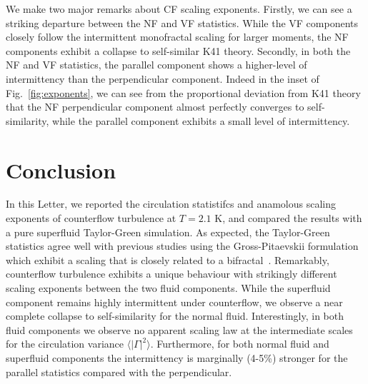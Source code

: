 \documentclass[%
 reprint,
 amsmath,amssymb,
 aps,
 prl,
]{revtex4-2}
\begin{document}
We make two major remarks about CF scaling exponents. 
Firstly, we can see a striking departure between the NF and VF statistics.
While the VF components closely follow the intermittent monofractal scaling for larger moments, the NF components exhibit a collapse to self-similar K41 theory.
Secondly, in both the NF and VF statistics, the parallel component shows a higher-level of intermittency than the perpendicular component. 
Indeed in the inset of Fig.~\ref{fig:exponents}, we can see from the proportional deviation from K41 theory that the NF perpendicular component almost perfectly converges to self-similarity, while the parallel component exhibits a small level of intermittency.

\section{Conclusion}

In this Letter, we reported the circulation statistifcs and anamolous scaling exponents of counterflow turbulence at $T=2.1$ K, and compared the results with a pure superfluid Taylor-Green simulation.
As expected, the Taylor-Green statistics agree well with previous studies using the Gross-Pitaevskii formulation~\cite{muller2021,polanco2021} which exhibit a scaling that is closely related to a bifractal~\cite{iyer2019}.
Remarkably, counterflow turbulence exhibits a unique behaviour with strikingly different scaling exponents between the two fluid components.
While the superfluid component remains highly intermittent under counterflow, we observe a near complete collapse to self-similarity for the normal fluid.
Interestingly, in both fluid components we observe no apparent scaling law at the intermediate scales for the circulation variance $\langle|\Gamma|^2\rangle$.
Furthermore, for both normal fluid and superfluid components the intermittency is marginally (4-5\%) stronger for the parallel statistics compared with the perpendicular.






\begin{acknowledgments}
\end{acknowledgments}
\end{document}
